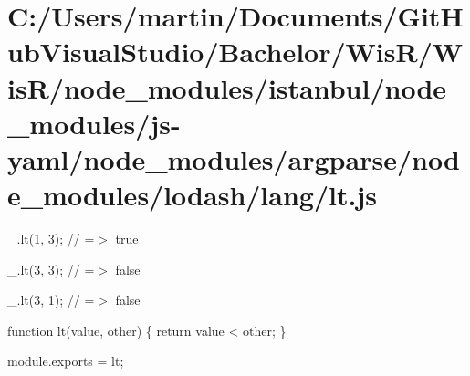 \hypertarget{_c_1_2_users_2martin_2_documents_2_git_hub_visual_studio_2_bachelor_2_wis_r_2_wis_r_2node_module1479728f378fc54a66f4a0ad1d4e598a}{}\section{C\+:/\+Users/martin/\+Documents/\+Git\+Hub\+Visual\+Studio/\+Bachelor/\+Wis\+R/\+Wis\+R/node\+\_\+modules/istanbul/node\+\_\+modules/js-\/yaml/node\+\_\+modules/argparse/node\+\_\+modules/lodash/lang/lt.\+js}
\+\_\+.\+lt(1, 3); // =$>$ true

\+\_\+.\+lt(3, 3); // =$>$ false

\+\_\+.\+lt(3, 1); // =$>$ false


\begin{DoxyCodeInclude}

\textcolor{keyword}{function} lt(value, other) \{
  \textcolor{keywordflow}{return} value < other;
\}

module.exports = lt;
\end{DoxyCodeInclude}
 